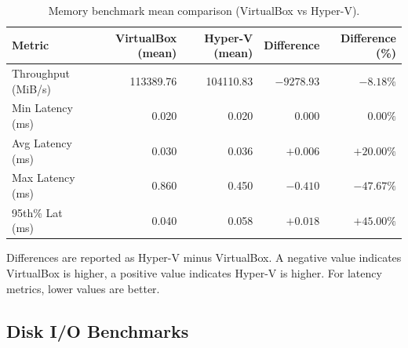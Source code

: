 \documentclass[a4paper, 12pt]{article}
\theoremstyle{plain}
\theoremstyle{definition}
\theoremstyle{remark}
\begin{document}
    \begin{table}[H]
    \centering
    \caption{Memory benchmark mean comparison (VirtualBox vs Hyper-V).}
    \label{tab:mem-compare}
    \begin{tabular}{lrrrr}
    \hline
    \textbf{Metric} & \textbf{VirtualBox (mean)} & \textbf{Hyper-V (mean)} & \textbf{Difference} & \textbf{Difference (\%)} \\
    \hline
    Throughput (MiB/s) & 113389.76 & 104110.83 & $-9278.93$  & $-8.18\%$ \\
    Min Latency (ms)   & 0.020     & 0.020     & $0.000$     & $0.00\%$  \\
    Avg Latency (ms)   & 0.030     & 0.036     & $+0.006$    & $+20.00\%$ \\
    Max Latency (ms)   & 0.860     & 0.450     & $-0.410$    & $-47.67\%$ \\
    95th\% Lat (ms)    & 0.040     & 0.058     & $+0.018$    & $+45.00\%$ \\
    \hline
    \end{tabular}
    \end{table}

    \noindent Differences are reported as Hyper-V minus VirtualBox. A negative value indicates VirtualBox is higher, a positive value indicates Hyper-V is higher. For latency metrics, lower values are better.

    \subsection{Disk I/O Benchmarks}
\end{document}
